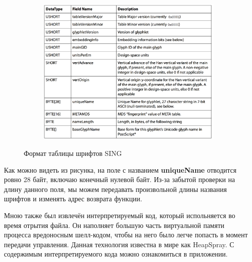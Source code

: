\begin{figure}[ht]
	\centering
    \begin{subfigure}[b]{1\textwidth}
    \centering
        \includegraphics[scale=0.5]{1.pdf/pasted-image-15.png}
    \end{subfigure}
 
    \caption{Формат таблицы шрифтов SING}
    \label{fig_parsetree}
\end{figure}

Как можно видеть из рисунка, на поле с названием \textbf{uniqueName} отводится ровно 28 байт, включаю конечный нулевой байт.
Из-за забытой проверки на длину данного поля, мы можем передавать произвольной длины названия шрифтов и изменять адрес возврата функции.

Мною также был извлечён интерпретируемый код, который испольняется во время отрытия файла.
Он наполняет большую часть виртуальной памяти процесса вредоносным шелл-кодом, чтобы на него было легче попасть в момент передачи управления.
Данная технология известна в мире как HeapSpray. \cite{heap_spray}
С содержимым интерпретируемого кода можно ознакомиться в приложении.

